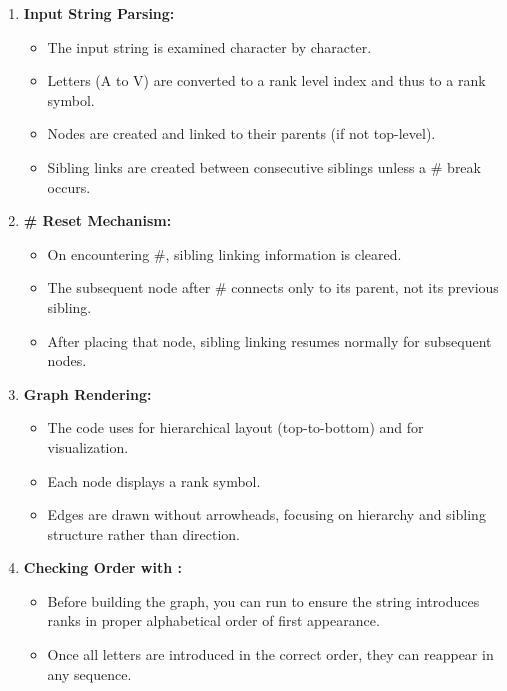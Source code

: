 \begin{enumerate}
    \item \textbf{Input String Parsing:} 
    \begin{itemize}
        \item  The input string is examined character by character.
        \item Letters (A to V) are converted to a rank level index and thus to a rank symbol.
        \item Nodes are created and linked to their parents (if not top-level).
        \item Sibling links are created between consecutive siblings unless a \# break occurs.
    \end{itemize}
    \item \textbf{\# Reset Mechanism:} 
    \begin{itemize}
        \item  On encountering \#, sibling linking information is cleared.
        \item The subsequent node after \# connects only to its parent, not its previous sibling.
        \item After placing that node, sibling linking resumes normally for subsequent nodes.
    \end{itemize}
    \item \textbf{Graph Rendering:} 
    \begin{itemize}
        \item  The code uses  for hierarchical layout (top-to-bottom) and  for visualization.
        \item Each node displays a rank symbol.
        \item Edges are drawn without arrowheads, focusing on hierarchy and sibling structure rather than direction.
    \end{itemize}
    \item \textbf{Checking Order with :} 
    \begin{itemize}
        \item  Before building the graph, you can run  to ensure the string introduces ranks in proper alphabetical order of first appearance.
        \item Once all letters are introduced in the correct order, they can reappear in any sequence.
    \end{itemize}
\end{enumerate}

